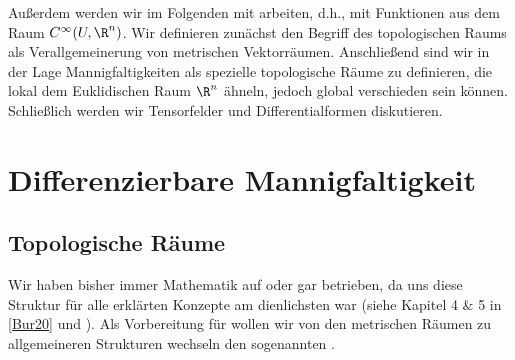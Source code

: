 \documentclass[letterpaper,10pt,english]{jupyterBook}
\begin{document}
\sphinxAtStartPar
Außerdem werden wir im Folgenden mit  arbeiten, d.h., mit Funktionen aus dem Raum \(C^\infty(U,\R^n)\).
Wir definieren zunächst den Begriff des topologischen Raums als Verallgemeinerung von metrischen Vektorräumen.
Anschließend sind wir in der Lage Mannigfaltigkeiten als spezielle topologische Räume zu definieren, die lokal dem Euklidischen Raum \(\R^n\) ähneln, jedoch global verschieden sein können.
Schließlich werden wir Tensorfelder und Differentialformen diskutieren.


\section{Differenzierbare Mannigfaltigkeit}
\label{\detokenize{manifolds/manifolds_prelim:differenzierbare-mannigfaltigkeit}}\label{\detokenize{manifolds/manifolds_prelim::doc}}

\subsection{Topologische Räume}
\label{\detokenize{manifolds/manifolds_prelim:topologische-raume}}
\sphinxAtStartPar
Wir haben bisher immer Mathematik auf  oder gar  betrieben, da uns diese Struktur für alle erklärten Konzepte am dienlichsten war (siehe Kapitel 4 \& 5 in {[}\hyperlink{cite.references:id2}{Bur20}{]} und ).
Als Vorbereitung für {\hyperref[\detokenize{manifolds/manifolds_prelim:s-mannigfaltigkeiten}]{}} wollen wir von den metrischen Räumen zu allgemeineren Strukturen wechseln \sphinxhyphen{} den sogenannten .
\end{document}
